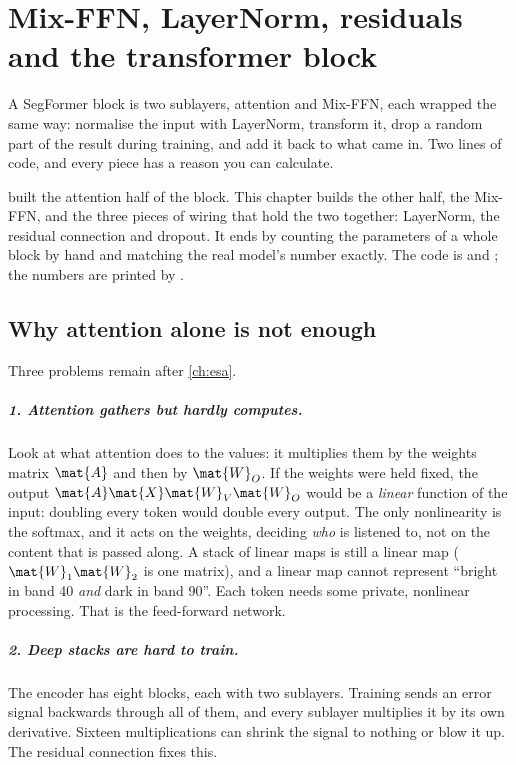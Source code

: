 \chapter{Mix-FFN, LayerNorm, residuals and the transformer block}\label{ch:block}

\begin{onething}
A SegFormer block is two sublayers, attention and Mix-FFN, each wrapped the same way: normalise
the input with LayerNorm, transform it, drop a random part of the result during training, and add
it back to what came in. Two lines of code, and every piece has a reason you can calculate.
\end{onething}

 built the attention half of the block. This chapter builds the other
half, the Mix-FFN, and the three pieces of wiring that hold the two together: LayerNorm, the
residual connection and dropout. It ends by counting the parameters of a whole block by hand and
matching the real model's number exactly. The code is
 and
; the numbers are printed by
.

\section{Why attention alone is not enough}\label{sec:block:why}

Three problems remain after \cref{ch:esa}.

\paragraph{1. Attention gathers but hardly computes.} Look at what attention does to the values:
it multiplies them by the weights matrix $\mat{A}$ and then by $\mat{W}_O$. If the weights were
held fixed, the output $\mat{A}\mat{X}\mat{W}_V\mat{W}_O$ would be a \emph{linear} function of the
input: doubling every token would double every output. The only nonlinearity is the softmax, and
it acts on the weights, deciding \emph{who} is listened to, not on the content that is passed
along. A stack of linear maps is still a linear map ($\mat{W}_1\mat{W}_2$ is one matrix), and a
linear map cannot represent ``bright in band 40 \emph{and} dark in band 90''. Each token needs some
private, nonlinear processing. That is the feed-forward network.

\paragraph{2. Deep stacks are hard to train.} The encoder has eight blocks, each with two
sublayers. Training sends an error signal backwards through all of them, and every sublayer
multiplies it by its own derivative. Sixteen multiplications can shrink the signal to nothing or
blow it up. The residual connection fixes this.

